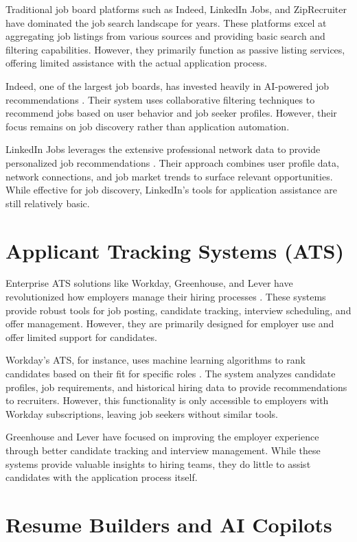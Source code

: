 \documentclass[12pt,a4paper]{report}
\begin{document}
Traditional job board platforms such as Indeed, LinkedIn Jobs, and ZipRecruiter have dominated the job search landscape for years. These platforms excel at aggregating job listings from various sources and providing basic search and filtering capabilities. However, they primarily function as passive listing services, offering limited assistance with the actual application process.

Indeed, one of the largest job boards, has invested heavily in AI-powered job recommendations \cite{indeed2020}. Their system uses collaborative filtering techniques to recommend jobs based on user behavior and job seeker profiles. However, their focus remains on job discovery rather than application automation.

LinkedIn Jobs leverages the extensive professional network data to provide personalized job recommendations \cite{linkedin2019}. Their approach combines user profile data, network connections, and job market trends to surface relevant opportunities. While effective for job discovery, LinkedIn's tools for application assistance are still relatively basic.

\section*{Applicant Tracking Systems (ATS)}

Enterprise ATS solutions like Workday, Greenhouse, and Lever have revolutionized how employers manage their hiring processes \cite{workday2021, greenhouse2020, lever2021}. These systems provide robust tools for job posting, candidate tracking, interview scheduling, and offer management. However, they are primarily designed for employer use and offer limited support for candidates.

Workday's ATS, for instance, uses machine learning algorithms to rank candidates based on their fit for specific roles \cite{workday2021}. The system analyzes candidate profiles, job requirements, and historical hiring data to provide recommendations to recruiters. However, this functionality is only accessible to employers with Workday subscriptions, leaving job seekers without similar tools.

Greenhouse and Lever have focused on improving the employer experience through better candidate tracking and interview management. While these systems provide valuable insights to hiring teams, they do little to assist candidates with the application process itself.

\section*{Resume Builders and AI Copilots}
\end{document}
